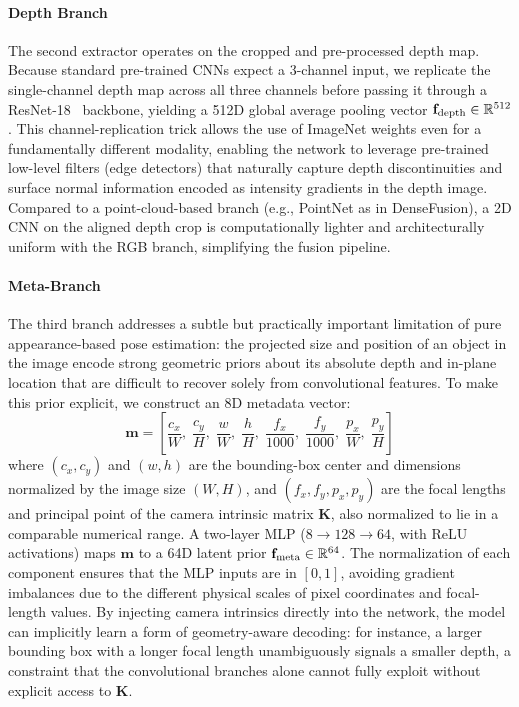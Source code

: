 \paragraph{Depth Branch}
The second extractor operates on the cropped and pre-processed depth map.
Because standard pre-trained CNNs expect a 3-channel input, we replicate the single-channel depth map across all three channels before passing it through a ResNet-18~\cite{he2016deep} backbone, yielding a 512D global average pooling vector $\mathbf{f}_{\text{depth}} \in \mathbb{R}^{512}$.
This channel-replication trick allows the use of ImageNet weights even for a fundamentally different modality, enabling the network to leverage pre-trained low-level filters (edge detectors) that naturally capture depth discontinuities and surface normal information encoded as intensity gradients in the depth image.
Compared to a point-cloud-based branch (e.g., PointNet as in DenseFusion), a 2D CNN on the aligned depth crop is computationally lighter and architecturally uniform with the RGB branch, simplifying the fusion pipeline.


\paragraph{Meta-Branch}
The third branch addresses a subtle but practically important limitation of pure appearance-based pose estimation: the projected size and position of an object in the image encode strong geometric priors about its absolute depth and in-plane location that are difficult to recover solely from convolutional features.
To make this prior explicit, we construct an 8D metadata vector:
\begin{equation}
\mathbf{m} = \left[\frac{c_x}{W},\; \frac{c_y}{H},\; \frac{w}{W},\; \frac{h}{H},\; \frac{f_x}{1000},\; \frac{f_y}{1000},\; \frac{p_x}{W},\; \frac{p_y}{H}\right]
\label{eq:meta}
\end{equation}
where $(c_x, c_y)$ and $(w, h)$ are the bounding-box center and dimensions normalized by the image size $(W, H)$, and $(f_x, f_y, p_x, p_y)$ are the focal lengths and principal point of the camera intrinsic matrix $\mathbf{K}$, also normalized to lie in a comparable numerical range.
A two-layer MLP ($8 \rightarrow 128 \rightarrow 64$, with ReLU activations) maps $\mathbf{m}$ to a 64D latent prior $\mathbf{f}_{\text{meta}} \in \mathbb{R}^{64}$.
The normalization of each component ensures that the MLP inputs are in $[0,1]$, avoiding gradient imbalances due to the different physical scales of pixel coordinates and focal-length values.
By injecting camera intrinsics directly into the network, the model can implicitly learn a form of geometry-aware decoding: for instance, a larger bounding box with a longer focal length unambiguously signals a smaller depth, a constraint that the convolutional branches alone cannot fully exploit without explicit access to $\mathbf{K}$.

